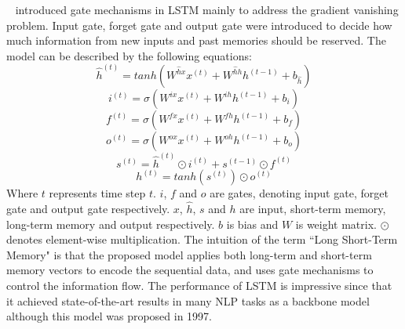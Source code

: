 ~ introduced gate mechanisms in LSTM mainly to address the gradient vanishing problem. Input gate, forget gate and output gate were introduced to decide how much information from new inputs and past memories should be reserved. The model can be described by the following equations: 
\begin{equation}
\hat{h}^{(t)} = tanh\left(W^{\hat{h}x} x^{(t)} + W^{\hat{h}h} h^{(t-1)} + b_{\hat{h}}\right)
\end{equation}
\begin{equation}
i^{(t)} = \sigma\left(W^{ix} x^{(t)} + W^{ih} h^{(t-1)} + b_i\right)
\end{equation}
\begin{equation}
f^{(t)} = \sigma\left(W^{fx} x^{(t)} + W^{fh} h^{(t-1)} + b_f\right)
\end{equation}
\begin{equation}
o^{(t)} = \sigma\left(W^{ox} x^{(t)} + W^{oh} h^{(t-1)} + b_o\right)
\end{equation}
\begin{equation}
s^{(t)} = \hat{h}^{(t)} \odot i^{(t)} + s^{(t-1)} \odot f^{(t)}
\end{equation}
\begin{equation}
h^{(t)} = tanh (s^{(t)})\odot o^{(t)}
\end{equation}
Where $t$ represents time step $t$. $i$, $f$ and $o$ are gates, denoting input gate, forget gate and output gate respectively. $x$, $\hat{h}$, $s$ and $h$ are input, short-term memory, long-term memory and output respectively. $b$ is bias and $W$ is weight matrix. $\odot$ denotes element-wise multiplication. 
The intuition of the term ``Long Short-Term Memory" is that the proposed model applies both long-term and short-term memory vectors to encode the sequential data, and uses gate mechanisms to control the information flow. The performance of LSTM is impressive since that it achieved state-of-the-art results in many NLP tasks as a backbone model although this model was proposed in 1997.

